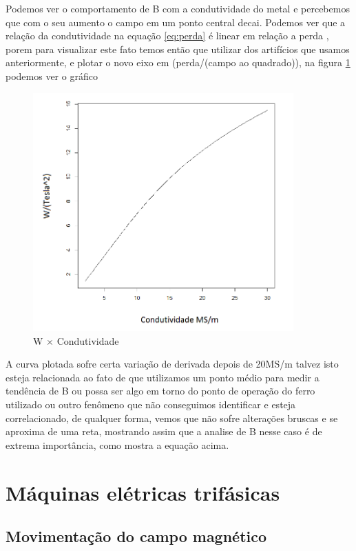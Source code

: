 \documentclass[
	12pt,				%
	openright,			%
	twoside,			%
	a4paper,			%
	english,			%
	french,				%
	spanish,			%
	brazil,				%
	]{abntex2}
\begin{document}
Podemos ver o comportamento de B com a condutividade do metal e percebemos que com o seu aumento o campo em um ponto central decai. 
Podemos ver que a relação da condutividade na equação \ref{eq:perda}  é linear  em relação a perda , porem para visualizar este fato temos então que utilizar dos artifícios que usamos anteriormente, e plotar o novo eixo em (perda/(campo ao quadrado)), na figura \ref{fig:gra_w_c} podemos ver o gráfico  
 
\begin{figure}[H]
    \centering
    \includegraphics[width=10cm]{img/w_condutividade.png}
    \caption{W $\times$ Condutividade}
    \label{fig:gra_w_c}
\end{figure}


A curva plotada sofre certa variação de derivada depois de 20MS/m talvez isto esteja relacionada ao fato de que utilizamos um ponto médio para medir a tendência de B ou possa ser algo em torno do ponto de operação do ferro utilizado ou outro fenômeno que não conseguimos identificar e esteja correlacionado, de qualquer forma, vemos que não sofre alterações bruscas e se aproxima de uma reta, mostrando assim que a analise de B nesse caso é de extrema importância, como mostra a equação acima.


\chapter[Máquinas elétricas trifásicas]{Máquinas elétricas trifásicas}

\section{Movimentação do campo magnético}
\end{document}
